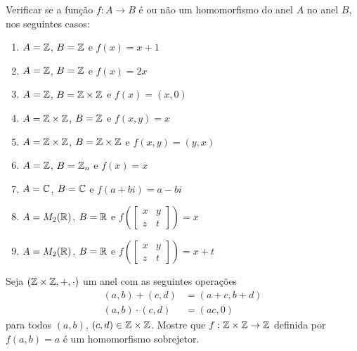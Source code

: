 \documentclass[12pt]{exam}
\begin{document}
     Verificar se a função $f : A \to B$ é ou não um homomorfismo do anel $A$ no anel $B$, nos seguintes casos:
    \begin{enumerate}[label=({\alph*})]
        \item $A = \mathbb{Z}$, $B = \mathbb{Z}$ e $f(x) = x + 1$

        \item $A = \mathbb{Z}$, $B = \mathbb{Z}$ e $f(x) = 2x$

        \item $A = \mathbb{Z}$, $B = \mathbb{Z} \times \mathbb{Z}$ e $f(x) = (x, 0)$

        \item $A = \mathbb{Z} \times \mathbb{Z}$, $B = \mathbb{Z}$ e $f(x,y) = x$

        \item $A = \mathbb{Z} \times \mathbb{Z}$, $B = \mathbb{Z} \times \mathbb{Z}$ e $f(x,y) = (y,x)$

        \item $A = \mathbb{Z}$, $B = \mathbb{Z}_n$ e $f(x) = \overline{x}$

        \item $A = \mathbb{C}$, $B = \mathbb{C}$ e $f(a + bi) = a - bi$

        \item $A = M_2(\mathbb{R})$, $B = \mathbb{R}$ e $f\left(\begin{bmatrix}
            x & y\\z & t
        \end{bmatrix}\right) = x$

        \item $A = M_2(\mathbb{R})$, $B = \mathbb{R}$ e $f\left(\begin{bmatrix}
            x & y\\z & t
        \end{bmatrix}\right) = x + t$
    \end{enumerate}

    \vspace{.3cm}

    \questao{} Seja $(\mathbb{Z}\times\mathbb{Z}, +, \cdot)$ um anel com as seguintes operações
    \begin{align*}
        (a, b) + (c, d) &= (a + c, b + d)\\
        (a, b)\cdot (c, d) &= (ac, 0)
    \end{align*}
    para todos $(a, b)$, $(c, d) \in \mathbb{Z}\times\mathbb{Z}$.
    Mostre que $ f : \mathbb{Z}\times\mathbb{Z} \to \mathbb{Z}$ definida por $f(a, b) = a$ é um homomorfismo sobrejetor.

    \vspace{.3cm}
\end{document}
